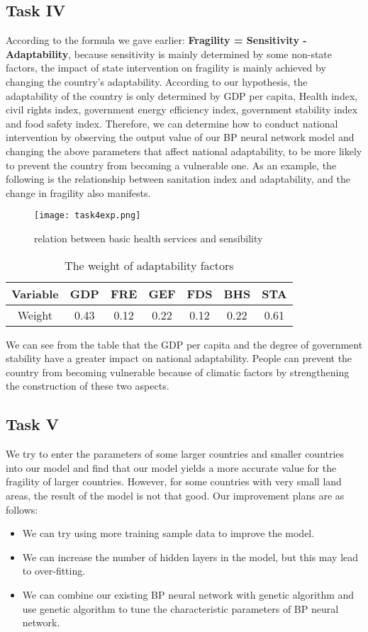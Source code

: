\documentclass{mcmthesis}
\begin{document}
\subsection{Task IV}
According to the formula we gave earlier:
\textbf{Fragility = Sensitivity - Adaptability}, 
because sensitivity is mainly determined by some non-state 
factors, the impact of state intervention on fragility 
is mainly achieved by changing the country's adaptability. 
According to our hypothesis, the adaptability of the country 
is only determined by GDP per capita, Health index, civil 
rights index, government energy efficiency index, government 
stability index and food safety index. Therefore, we can 
determine how to conduct national intervention by observing 
the output value of our BP neural network model and changing 
the above parameters that affect national adaptability, to be 
more likely to prevent the country from becoming a vulnerable 
one. As an example, the following is the relationship between 
sanitation index and adaptability, and the change in fragility 
also manifests.
\begin{figure}[htbp]
  \centering
  \texttt{[image: task4exp.png]}
  \caption{relation between basic health services and sensibility}
  \label{fig:sanitation}
\end{figure}
\begin{table}[h]
  \centering
  \begin{tabular} {|c|c|c|c|c|c|c|}  
  \hline  
  Variable & GDP & FRE & GEF & FDS & BHS & STA \\ \hline  
  Weight & 0.43 & 0.12 & 0.22 & 0.12 & 0.22 & 0.61  \\ \hline  
  \end{tabular}  
  \caption{The weight of adaptability factors}
\end{table}
We can see from the table that the GDP per capita and the 
degree of government stability have a greater impact on 
national adaptability. People can prevent the country from 
becoming vulnerable because of climatic factors by strengthening 
the construction of these two aspects.

\subsection{Task V}
We try to enter the parameters of some larger countries and 
smaller countries into our model and find that our model yields 
a more accurate value for the fragility of larger countries. 
However, for some countries with very small land areas, the 
result of the model is not that good. Our improvement plans 
are as follows:
\begin{itemize}
  \item We can try using more training sample data to improve the model.
  \item We can increase the number of hidden layers in the model, but 
  this may lead to over-fitting.
  \item We can combine our existing BP neural network with genetic 
  algorithm and use genetic algorithm to tune the characteristic 
  parameters of BP neural network.
\end{itemize}
\end{document}
